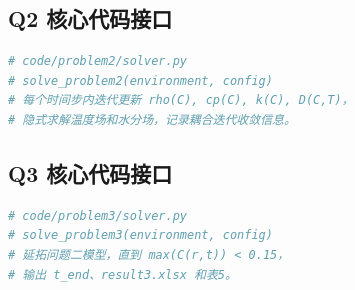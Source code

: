 \documentclass[UTF8,a4paper,12pt]{ctexart}
\numberwithin{equation}{section}
\begin{document}
\subsection{Q2 核心代码接口}
\begin{lstlisting}[language=Python,caption={问题二 Picard 耦合求解接口}]
# code/problem2/solver.py
# solve_problem2(environment, config)
# 每个时间步内迭代更新 rho(C), cp(C), k(C), D(C,T)，
# 隐式求解温度场和水分场，记录耦合迭代收敛信息。
\end{lstlisting}

\subsection{Q3 核心代码接口}
\begin{lstlisting}[language=Python,caption={问题三达标停机接口}]
# code/problem3/solver.py
# solve_problem3(environment, config)
# 延拓问题二模型，直到 max(C(r,t)) < 0.15，
# 输出 t_end、result3.xlsx 和表5。
\end{lstlisting}
\end{document}
